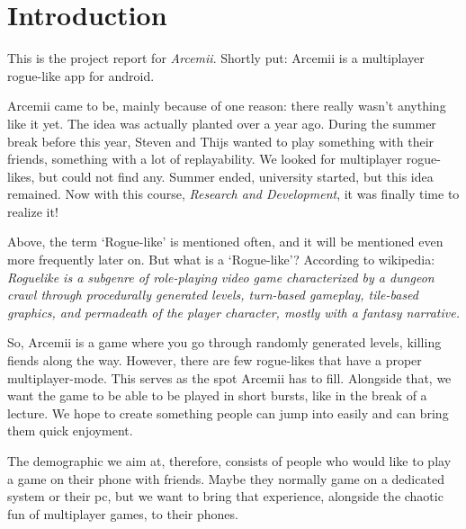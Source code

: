 \documentclass[../main.tex]{subfiles}
\begin{document}
\pagebreak
\section{Introduction}
This is the project report for \textit{Arcemii}. Shortly put: Arcemii is a multiplayer rogue-like app for android.

Arcemii came to be, mainly because of one reason: there really wasn't anything like it yet. The idea was actually planted over a year ago. During the summer break before this year, Steven and Thijs wanted to play something with their friends, something with a lot of replayability. We looked for multiplayer rogue-likes, but could not find any. Summer ended, university started, but this idea remained. Now with this course, \textit{Research and Development}, it was finally time to realize it!

\bigbreak\noindent
Above, the term `Rogue-like' is mentioned often, and it will be mentioned even more frequently later on. But what is a `Rogue-like'?  According to wikipedia: \textit{Roguelike is a subgenre of role-playing video game characterized by a dungeon crawl through procedurally generated levels, turn-based gameplay, tile-based graphics, and permadeath of the player character, mostly with a fantasy narrative.}

So, Arcemii is a game where you go through randomly generated levels, killing fiends along the way. However, there are few rogue-likes that have a proper multiplayer-mode. This serves as the  spot Arcemii has to fill. Alongside that, we want the game to be able to be played in short bursts, like in the break of a lecture. We hope to create something people can jump into easily and can bring them quick enjoyment. 

The demographic we aim at, therefore, consists of people who would like to play a game on their phone with friends. Maybe they normally game on a dedicated system or their pc, but we want to bring that experience, alongside the chaotic fun of multiplayer games, to their phones.
\end{document}
